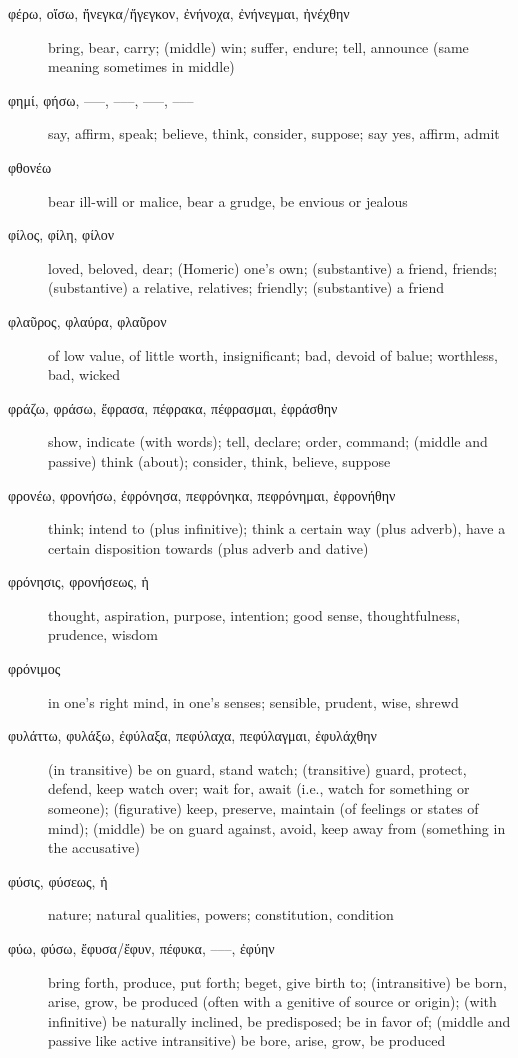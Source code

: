 \documentclass[12pt,letterpaper]{article}
\begin{document}
\begin{description}
    \item[\textgreek{φέρω, οἴσω, ἤνεγκα/ἤγεγκον, ἐνήνοχα, ἐνήνεγμαι, ἠνέχθην}] \marginnote{*}bring, bear, carry; (middle) win; suffer, endure; tell, announce (same meaning sometimes in middle)
    \item[\textgreek{φημί, φήσω, –––, –––, –––, –––}] \marginnote{*}say, affirm, speak; believe, think, consider, suppose; say yes, affirm, admit
    \item[\textgreek{φθονέω}] bear ill-will or malice, bear a grudge, be envious or jealous
    \item[\textgreek{φίλος, φίλη, φίλον}] \marginnote{*}loved, beloved, dear; (Homeric) one's own; (substantive) a friend, friends; (substantive) a relative, relatives; friendly; (substantive) a friend
    \item[\textgreek{φλαῦρος, φλαύρα, φλαῦρον}] of low value, of little worth, insignificant; bad, devoid of balue; worthless, bad, wicked
    \item[\textgreek{φράζω, φράσω, ἔφρασα, πέφρακα, πέφρασμαι, ἐφράσθην}] \marginnote{*}show, indicate (with words); tell, declare; order, command; (middle and passive) think (about); consider, think, believe, suppose
    \item[\textgreek{φρονέω, φρονήσω, ἐφρόνησα, πεφρόνηκα, πεφρόνημαι, ἐφρονήθην}] \marginnote{*}think; intend to (plus infinitive); think a certain way (plus adverb), have a certain disposition towards (plus adverb and dative)
    \item[\textgreek{φρόνησις, φρονήσεως, ἡ}] thought, aspiration, purpose, intention; good sense, thoughtfulness, prudence, wisdom
    \item[\textgreek{φρόνιμος}] in one's right mind, in one's senses; sensible, prudent, wise, shrewd
    \item[\textgreek{φυλάττω, φυλάξω, ἐφύλαξα, πεφύλαχα, πεφύλαγμαι, ἐφυλάχθην}] \marginnote{*}(in transitive) be on guard, stand watch; (transitive) guard, protect, defend, keep watch over; wait for, await (i.e., watch for something or someone); (figurative) keep, preserve, maintain (of feelings or states of mind); (middle) be on guard against, avoid, keep away from (something in the accusative)
    \item[\textgreek{φύσις, φύσεως, ἡ}] \marginnote{*}nature; natural qualities, powers; constitution, condition
    \item[\textgreek{φύω, φύσω, ἔφυσα/ἔφυν, πέφυκα, –––, ἐφύην}] \marginnote{*}bring forth, produce, put forth; beget, give birth to; (intransitive) be born, arise, grow, be produced (often with a genitive of source or origin); (with infinitive) be naturally inclined, be predisposed; be in favor of; (middle and passive like active intransitive) be bore, arise, grow, be produced

\end{description}
\end{document}
